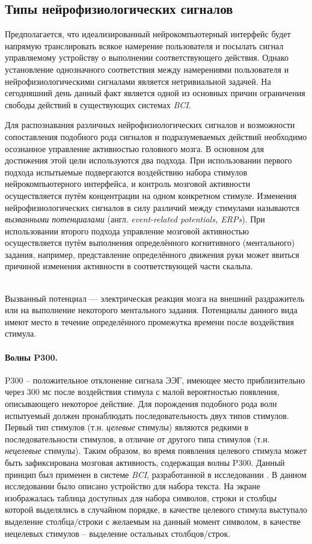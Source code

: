 \documentclass[12pt,a4paper,oneside,fleqn,leqno]{article}
\newcounter{pe} %
\newcommand*{\Nep}{\addtocounter{pe}{1}{\arabic{pe}$^{\circ}$.\;}}
\newcommand*{\NepS}{\mbox{} \\ \Nep}
\begin{document}
	\subsection{Типы нейрофизиологических сигналов}
	\par Предполагается, что идеализированный нейрокомпьютерный интерфейс будет напрямую транслировать всякое намерение пользователя и посылать сигнал управляемому устройству о выполнении соответствующего действия. Однако установление однозначного соответствия между намерениями пользователя и нейрофизиологическими сигналами является нетривиальной задачей. На сегодняшний день данный факт является одной из основных причин ограничения свободы действий в существующих системах {\it BCI}.
	\par Для распознавания различных нейрофизиологических сигналов и возможности сопоставления подобного рода сигналов и подразумеваемых действий необходимо осознанное управление активностью головного мозга. В основном для достижения этой цели используются два подхода. При использовании первого подхода испытыемые подвергаются воздействию набора стимулов нейрокомпьютерного интерфейса, и контроль мозговой активности осуществляется путём концентрации на одном конкретном стимуле. Изменения нейрофизиологических сигналов в силу различий между стимулами называются {\it вызванными потенциалами} (англ. {\it event-related potentials, ERPs}). При использовании второго подхода управление мозговой активностью осуществляется путём выполнения определённого когнитивного (ментального) задания, например, представление определённого движения руки может явиться причиной изменения активности в соответствующей части скальпа.\\
	\setcounter{pe}{0}
	\NepS {\bf Вызванные потенциалы}
	\par Вызванный потенциал — электрическая реакция мозга на внешний раздражитель или на выполнение некоторого ментального задания. Потенциалы данного вида имеют место в течение определённого промежутка времени после воздействия стимула.
	\paragraph{Волны P300.}
	 P300 -- положительное отклонение сигнала ЭЭГ, имеющее место приблизительно через 300 мс после воздействия стимула с малой вероятностью появления, описывающего некоторое действие. Для порождения подобного рода волн испытуемый должен пронаблюдать последовательность двух типов стимулов. Первый тип стимулов (т.н. {\it целевые} стимулы) являются редкими в последовательности стимулов, в отличие от другого типа стимулов (т.н. {\it нецелевые} стимулы). Таким образом, во время появления целевого стимула может быть зафиксирована мозговая активность, содержащая волны P300. Данный принцип был применен в системе {\it BCI}, разработанной в исследовании \cite{Farwell_Donchin}. В данном исследовании было описано устройство для набора текста. На экране изображалась таблица доступных для набора символов, строки и столбцы которой выделялись в случайном порядке, в качестве целевого стимула выступало выделение столбца/строки с желаемым на данный момент символом, в качестве нецелевых стимулов -- выделение остальных столбцов/строк.
\end{document}

